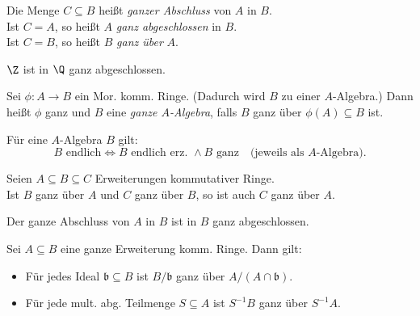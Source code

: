 \documentclass{cheat-sheet}
\newcommand{\bbb}{\mathfrak{b}}
\begin{document}

\begin{defn}
  \begin{minipage}[t]{0.88 \linewidth}
    Die Menge $C \subseteq B$ heißt \emph{ganzer Abschluss} von $A$ in $B$. \\
    Ist $C = A$, so heißt $A$ \emph{ganz abgeschlossen} in $B$. \\
    Ist $C = B$, so heißt $B$ \emph{ganz über} $A$.
  \end{minipage}
\end{defn}

\begin{bsp}
  $\Z$ ist in $\Q$ ganz abgeschlossen.
\end{bsp}

\begin{defn}
  Sei $\phi : A \to B$ ein Mor. komm. Ringe.
  (Dadurch wird $B$ zu einer $A$-Algebra.)
  Dann heißt $\phi$ ganz und $B$ eine \emph{ganze $A$-Algebra}, falls $B$ ganz über $\phi(A) \subseteq B$ ist.
\end{defn}

\begin{lem}
  Für eine $A$-Algebra $B$ gilt:
  \[
    B \text{ endlich} \iff B \text{ endlich erz. } \wedge B \text{ ganz}
    \quad \text{(jeweils als $A$-Algebra)}.
  \]
\end{lem}

\begin{kor}
  Seien $A \subseteq B \subseteq C$ Erweiterungen kommutativer Ringe. \\
  Ist $B$ ganz über $A$ und $C$ ganz über $B$, so ist auch $C$ ganz über $A$.
\end{kor}

\begin{kor}
  Der ganze Abschluss von $A$ in $B$ ist in $B$ ganz abgeschlossen.
\end{kor}

\begin{prop}
  Sei $A \subseteq B$ eine ganze Erweiterung komm. Ringe.
  Dann gilt:
  \begin{itemize}
    \item Für jedes Ideal $\bbb \subseteq B$ ist $B/\bbb$ ganz über $A / (A \cap \bbb)$.
    \item Für jede mult. abg. Teilmenge $S \subseteq A$ ist $S^{-1} B$ ganz über $S^{-1} A$.
  \end{itemize}
\end{prop}

\end{document}
